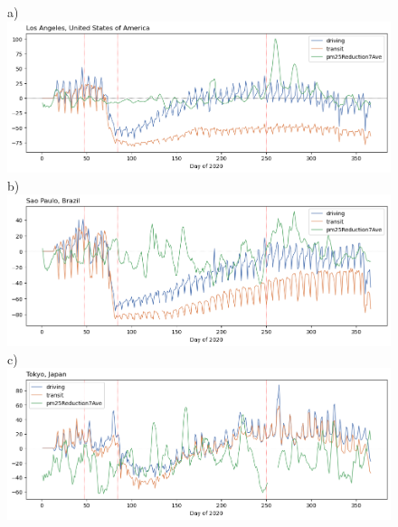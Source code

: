 \documentclass[preprint,10pt]{elsarticle} %
\begin{document}
\begin{figure}
     \centering
       \scriptsize a)~\includegraphics[width=\textwidth,trim={0 37 0 0},clip]{Images/LA_Drive_trans_pm25.png}
         \label{fig:LosAngeles}
         b)~\includegraphics[width=\textwidth,trim={0 37 0 0},clip]{Images/SaoPaulo_Drive_trans_pm25.png}
         \label{fig:SaoPaulo}
         c)~\includegraphics[width=\textwidth]{Images/Tokyo_Drive_trans_pm25.png}

\end{figure}
\end{document}
